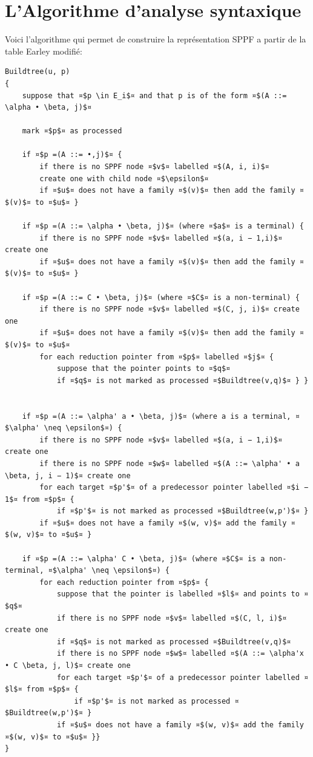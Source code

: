 \documentclass[10pt]{report}
\begin{document}
\section{L'Algorithme d'analyse syntaxique}

Voici l'algorithme qui permet de construire la représentation SPPF a partir de la table Earley modifié:
\begin{lstlisting}[frame=single]
Buildtree(u, p) 
{
	suppose that ¤$p \in E_i$¤ and that p is of the form ¤$(A ::= \alpha • \beta, j)$¤
	
	mark ¤$p$¤ as processed
	
	if ¤$p =(A ::= •,j)$¤ {
		if there is no SPPF node ¤$v$¤ labelled ¤$(A, i, i)$¤
		create one with child node ¤$\epsilon$¤
		if ¤$u$¤ does not have a family ¤$(v)$¤ then add the family ¤$(v)$¤ to ¤$u$¤ }
		
	if ¤$p =(A ::= \alpha • \beta, j)$¤ (where ¤$a$¤ is a terminal) {
		if there is no SPPF node ¤$v$¤ labelled ¤$(a, i − 1,i)$¤ create one
		if ¤$u$¤ does not have a family ¤$(v)$¤ then add the family ¤$(v)$¤ to ¤$u$¤ }
		
	if ¤$p =(A ::= C • \beta, j)$¤ (where ¤$C$¤ is a non-terminal) {
		if there is no SPPF node ¤$v$¤ labelled ¤$(C, j, i)$¤ create one
		if ¤$u$¤ does not have a family ¤$(v)$¤ then add the family ¤$(v)$¤ to ¤$u$¤ 
		for each reduction pointer from ¤$p$¤ labelled ¤$j$¤ {
			suppose that the pointer points to ¤$q$¤
			if ¤$q$¤ is not marked as processed ¤$Buildtree(v,q)$¤ } }
			
			
	if ¤$p =(A ::= \alpha' a • \beta, j)$¤ (where a is a terminal, ¤$\alpha' \neq \epsilon$¤) {
		if there is no SPPF node ¤$v$¤ labelled ¤$(a, i − 1,i)$¤ create one
		if there is no SPPF node ¤$w$¤ labelled ¤$(A ::= \alpha' • a \beta, j, i − 1)$¤ create one
		for each target ¤$p'$¤ of a predecessor pointer labelled ¤$i − 1$¤ from ¤$p$¤ {
			if ¤$p'$¤ is not marked as processed ¤$Buildtree(w,p')$¤ }
		if ¤$u$¤ does not have a family ¤$(w, v)$¤ add the family ¤$(w, v)$¤ to ¤$u$¤ }
			
	if ¤$p =(A ::= \alpha' C • \beta, j)$¤ (where ¤$C$¤ is a non-terminal, ¤$\alpha' \neq \epsilon$¤) {
		for each reduction pointer from ¤$p$¤ {
			suppose that the pointer is labelled ¤$l$¤ and points to ¤$q$¤
			if there is no SPPF node ¤$v$¤ labelled ¤$(C, l, i)$¤ create one
			if ¤$q$¤ is not marked as processed ¤$Buildtree(v,q)$¤
			if there is no SPPF node ¤$w$¤ labelled ¤$(A ::= \alpha'x • C \beta, j, l)$¤ create one 
			for each target ¤$p'$¤ of a predecessor pointer labelled ¤$l$¤ from ¤$p$¤ {
				if ¤$p'$¤ is not marked as processed ¤$Buildtree(w,p')$¤ }
			if ¤$u$¤ does not have a family ¤$(w, v)$¤ add the family ¤$(w, v)$¤ to ¤$u$¤ }}
}
		
		
\end{lstlisting}
\end{document}
